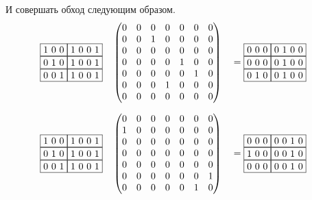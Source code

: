 \begin{example}
    И совершать обход следующим образом.
    \begin{alignat*}{7}
      & \begin{matrix}
        \fbox{1 0 0} \fbox{1 0 0 1} \\ 
        \fbox{0 1 0} \fbox{1 0 0 1} \\
        \fbox{0 0 1} \fbox{1 0 0 1}
          \end{matrix}  && \begin{pmatrix}
          0 & 0 & 0 & 0 & 0 & 0 & 0 \\
          0 & 0 & 1 & 0 & 0 & 0 & 0 \\
          0 & 0 & 0 & 0 & 0 & 0 & 0 \\
          0 & 0 & 0 & 0 & 1 & 0 & 0 \\
          0 & 0 & 0 & 0 & 0 & 1 & 0 \\
          0 & 0 & 0 & 1 & 0 & 0 & 0 \\
          0 & 0 & 0 & 0 & 0 & 0 & 0 
          \end{pmatrix} &&= \begin{matrix}
            \fbox{0 0 0} \fbox{0 1 0 0} \\ 
            \fbox{0 0 0} \fbox{0 1 0 0} \\
            \fbox{0 1 0} \fbox{0 1 0 0}
            \end{matrix}
      \end{alignat*}
    
    \begin{alignat*}{7}
      & \begin{matrix}
        \fbox{1 0 0} \fbox{1 0 0 1} \\ 
        \fbox{0 1 0} \fbox{1 0 0 1} \\
        \fbox{0 0 1} \fbox{1 0 0 1}
          \end{matrix}  && \begin{pmatrix}
          0 & 0 & 0 & 0 & 0 & 0 & 0 \\
          1 & 0 & 0 & 0 & 0 & 0 & 0 \\
          0 & 0 & 0 & 0 & 0 & 0 & 0 \\
          0 & 0 & 0 & 0 & 0 & 0 & 0 \\
          0 & 0 & 0 & 0 & 0 & 0 & 0 \\
          0 & 0 & 0 & 0 & 0 & 0 & 1 \\
          0 & 0 & 0 & 0 & 0 & 1 & 0 
          \end{pmatrix} &&= \begin{matrix}
            \fbox{0 0 0} \fbox{0 0 1 0} \\ 
            \fbox{1 0 0} \fbox{0 0 1 0} \\
            \fbox{0 0 0} \fbox{0 0 1 0}
            \end{matrix}
      \end{alignat*}
\end{example}

